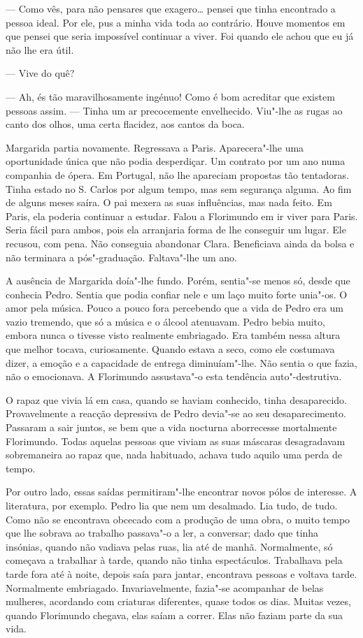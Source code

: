 --- Como vês, para não pensares que exagero\ldots{} pensei que tinha encontrado
a pessoa ideal. Por ele, pus a minha vida toda ao contrário. Houve
momentos em que pensei que seria impossível continuar a viver. Foi
quando ele achou que eu já não lhe era útil.

--- Vive do quê?

--- Ah, és tão maravilhosamente ingénuo! Como é bom acreditar que existem
pessoas assim. --- Tinha um ar precocemente envelhecido. Viu"-lhe as rugas
ao canto dos olhos, uma certa flacidez, aos cantos da boca.

Margarida partia novamente. Regressava a Paris. Aparecera"-lhe uma
oportunidade única que não podia desperdiçar. Um contrato por um ano
numa companhia de ópera. Em Portugal, não lhe apareciam propostas tão
tentadoras. Tinha estado no S. Carlos por algum tempo, mas sem segurança
alguma. Ao fim de alguns meses saíra. O pai mexera as suas influências,
mas nada feito. Em Paris, ela poderia continuar a estudar. Falou a
Florimundo em ir viver para Paris. Seria fácil para ambos, pois ela
arranjaria forma de lhe conseguir um lugar. Ele recusou, com pena. Não
conseguia abandonar Clara. Beneficiava ainda da bolsa e não terminara a
pós"-graduação. Faltava"-lhe um ano.

A ausência de Margarida doía"-lhe fundo. Porém, sentia"-se menos só, desde
que conhecia Pedro. Sentia que podia confiar nele e um laço muito forte
unia"-os. O amor pela música. Pouco a pouco fora percebendo que a vida de
Pedro era um vazio tremendo, que só a música e o álcool atenuavam. Pedro
bebia muito, embora nunca o tivesse visto realmente embriagado. Era
também nessa altura que melhor tocava, curiosamente. Quando estava a
seco, como ele costumava dizer, a emoção e a capacidade de entrega
diminuíam"-lhe. Não sentia o que fazia, não o emocionava. A Florimundo
assustava"-o esta tendência auto"-destrutiva.

O rapaz que vivia lá em casa, quando se haviam conhecido, tinha
desaparecido. Provavelmente a reacção depressiva de Pedro devia"-se ao
seu desaparecimento. Passaram a sair juntos, se bem que a vida nocturna
aborrecesse mortalmente Florimundo. Todas aquelas pessoas que viviam as
suas máscaras desagradavam sobremaneira ao rapaz que, nada habituado,
achava tudo aquilo uma perda de tempo.

Por outro lado, essas saídas permitiram"-lhe encontrar novos pólos de
interesse. A literatura, por exemplo. Pedro lia que nem um desalmado.
Lia tudo, de tudo. Como não se encontrava obcecado com a produção de uma
obra, o muito tempo que lhe sobrava ao trabalho passava"-o a ler, a
conversar; dado que tinha insónias, quando não vadiava pelas ruas, lia
até de manhã. Normalmente, só começava a trabalhar à tarde, quando não
tinha espectáculos. Trabalhava pela tarde fora até à noite, depois saía
para jantar, encontrava pessoas e voltava tarde. Normalmente embriagado.
Invariavelmente, fazia"-se acompanhar de belas mulheres, acordando com
criaturas diferentes, quase todos os dias. Muitas vezes, quando
Florimundo chegava, elas saíam a correr. Elas não faziam parte da sua
vida.

